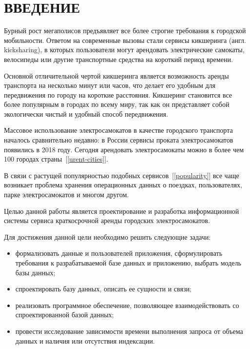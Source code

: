 \chapter*{ВВЕДЕНИЕ}

Бурный рост мегаполисов предъявляет все более строгие требования к городской мобильности. Ответом на современные вызовы стали сервисы кикшеринга (англ. kicksharing), в которых пользователи могут арендовать электрические самокаты, велосипеды или другие транспортные средства на короткий период времени.

Основной отличительной чертой кикшеринга является возможность аренды транспорта на несколько минут или часов, что делает его удобным для передвижения по городу на короткие расстояния. Кикшеринг становится все более популярным в городах по всему миру, так как он представляет собой экологически чистый и удобный способ передвижения.

Массовое использование электросамокатов в качестве городского транспорта началось сравнительно недавно: в России сервисы проката электросамокатов появились в 2018 году. Сегодня арендовать электросамокаты можно в более чем 100 городах страны~[\ref{urent-cities}].

В связи с растущей популярностью подобных сервисов~[\ref{popularity}] все чаще возникает проблема хранения операционных данных о поездках, пользователях, парке электросамокатов и многом другом.

Целью данной работы является проектирование и разработка информационной системы сервиса краткосрочной аренды городских электросамокатов.

Для достижения данной цели необходимо решить следующие задачи:

\begin{itemize}
	\item формализовать данные и пользователей приложения, сформулировать требования к разрабатываемой базе данных и приложению, выбрать модель базы данных;
	\item спроектировать базу данных, описать ее сущности и связи;
	\item реализовать программное обеспечение, позволяющее взаимодействовать со спроектированной базой данных;
	\item провести исследование зависимости времени выполнения запроса от объема данных и наличия или отсутствия индексации.
\end{itemize}